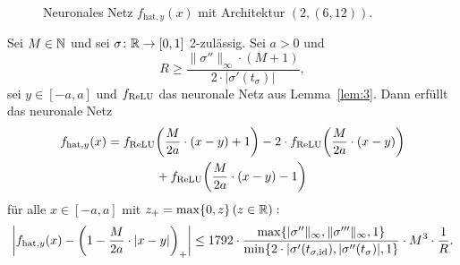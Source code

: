 \begin{figure}[htp]

\caption{Neuronales Netz $f_{\mathrm{\mathrm{hat}},y}(x)$ mit Architektur $(2, (6, 12))$.}
\label{fig:fhat}
\end{figure} 
  \begin{lem}
  \label{lem:4}
  Sei $M \in \mathbb{N}$ und sei $\sigma\colon \mathbb{R} \to [0, 1]$ 2-zulässig. Sei $a > 0$ und $$R \geq \frac{\|\sigma''\|_{\infty} \cdot (M + 1)}{2 \cdot |\sigma'(t_{\sigma})|},$$ sei $y \in [-a, a]$ und $f_{\mathrm{ReLU}}$ das neuronale Netz aus Lemma~\ref{lem:3}. Dann erfüllt das neuronale Netz 
  \begin{equation*}
  \begin{split}
  f_{\mathrm{hat},y}(x) = f_{\mathrm{ReLU}}& \bigg(\frac{M}{2a} \cdot (x - y) + 1\bigg) - 2 \cdot f_{\mathrm{ReLU}}\bigg(\frac{M}{2a} \cdot (x - y)\bigg) \\ &+ f_{\mathrm{ReLU}}\bigg(\frac{M}{2a} \cdot (x - y) - 1\bigg)
  \end{split}
  \end{equation*}
  für alle $x \in [-a ,a]$ mit $z_+ = \max\{0, z\} \, (z \in \mathbb{R}):$   
  $$\bigg|f_{\mathrm{hat},y}(x) - \bigg(1 - \frac{M}{2a} \cdot |x - y|\bigg)_+\bigg| \leq 1792 \cdot \frac{\max\{|\sigma''\|_{\infty}, \|\sigma'''\|_{\infty}, 1\}}{\min\{2 \cdot |\sigma'(t_{\sigma, \mathrm{id}}), |\sigma''(t_{\sigma})|, 1\}} \cdot M^3 \cdot \frac{1}{R}.$$
  \end{lem}
